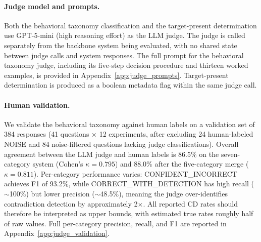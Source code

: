 \documentclass[11pt]{article}
\begin{document}
\paragraph{Judge model and prompts.} Both the behavioral taxonomy classification and the target-present determination use GPT-5-mini (high reasoning effort) as the LLM judge. The judge is called separately from the backbone system being evaluated, with no shared state between judge calls and system responses. The full prompt for the behavioral taxonomy judge, including its five-step decision procedure and thirteen worked examples, is provided in Appendix~\ref{app:judge_prompts}. Target-present determination is produced as a boolean metadata flag within the same judge call.

\paragraph{Human validation.} We validate the behavioral taxonomy against human labels on a validation set of 384 responses (41 questions $\times$ 12 experiments, after excluding 24 human-labeled NOISE and 84 noise-filtered questions lacking judge classifications). Overall agreement between the LLM judge and human labels is 86.5\% on the seven-category system (Cohen's $\kappa = 0.795$) and 88.0\% after the five-category merge ($\kappa = 0.811$). Per-category performance varies: CONFIDENT\_INCORRECT achieves F1 of 93.2\%, while CORRECT\_WITH\_DETECTION has high recall (${\sim}$100\%) but lower precision (${\sim}$48.5\%), meaning the judge over-identifies contradiction detection by approximately 2$\times$. All reported CD rates should therefore be interpreted as upper bounds, with estimated true rates roughly half of raw values. Full per-category precision, recall, and F1 are reported in Appendix~\ref{app:judge_validation}.
\end{document}

